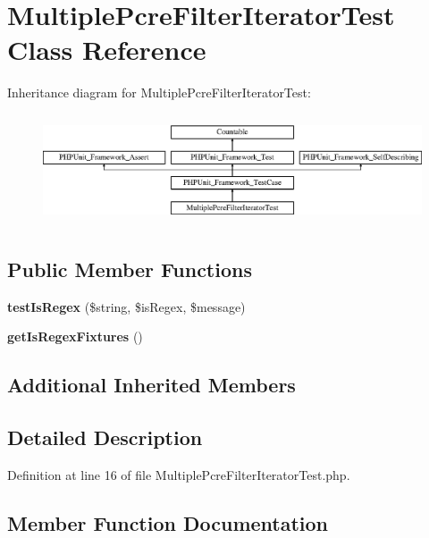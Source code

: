 \section{Multiple\+Pcre\+Filter\+Iterator\+Test Class Reference}
\label{class_symfony_1_1_component_1_1_finder_1_1_tests_1_1_iterator_1_1_multiple_pcre_filter_iterator_test}
Inheritance diagram for Multiple\+Pcre\+Filter\+Iterator\+Test\+:\begin{figure}[H]
\begin{center}
\leavevmode
\includegraphics[height=3.303835cm]{class_symfony_1_1_component_1_1_finder_1_1_tests_1_1_iterator_1_1_multiple_pcre_filter_iterator_test}
\end{center}
\end{figure}
\subsection*{Public Member Functions}
\begin{DoxyCompactItemize}
\item 
{\bf test\+Is\+Regex} (\$string, \$is\+Regex, \$message)
\item 
{\bf get\+Is\+Regex\+Fixtures} ()
\end{DoxyCompactItemize}
\subsection*{Additional Inherited Members}


\subsection{Detailed Description}


Definition at line 16 of file Multiple\+Pcre\+Filter\+Iterator\+Test.\+php.



\subsection{Member Function Documentation}
